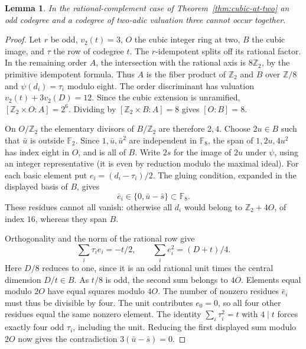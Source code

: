 \documentclass[11pt,a4paper]{article}
\newtheorem{lemma}[theorem]{Lemma}
\numberwithin{equation}{section}
\begin{document}
\begin{lemma}\label{lem:cubic-eight-depth}
In the rational-complement case of Theorem~\ref{thm:cubic-at-two}
an odd codegree and a codegree of two-adic valuation three cannot occur together.
\end{lemma}
\begin{proof}
Let $r$ be odd, $v_2(t)=3$, $O$ the cubic integer ring at two, $B$ the cubic image, and $\tau$ the row of codegree $t$. The $r$-idempotent splits off its rational factor. In the
remaining order $A$, the intersection with the rational axis is
$8\mathbb Z_2$, by the primitive idempotent formula. Thus $A$ is
the fiber product of $\mathbb Z_2$ and $B$ over $\mathbb Z/8$ and
$\psi(d_i)=\tau_i$ modulo eight. The order discriminant has
valuation $v_2(t)+3v_2(D)=12$. Since the cubic extension is unramified,
$[\mathbb Z_2\times O:A]=2^6$. Dividing by
$[\mathbb Z_2\times B:A]=8$ gives $[O:B]=8$.

On $O/\mathbb Z_2$ the elementary divisors of $B/\mathbb Z_2$ are
therefore $2,4$. Choose $2u\in B$ such that $\bar u$ is outside
$\mathbb F_2$. Since $1,\bar u,\bar u^2$ are independent in
$\mathbb F_8$, the span of $1,2u,4u^2$ has index eight in $O$,
and is all of $B$. Write $2s$ for the image of $2u$ under
$\psi$, using an integer representative
(it is even by reduction modulo the maximal ideal). For each basic
element put $e_i=(d_i-\tau_i)/2$. The gluing condition, expanded in
the displayed basis of $B$, gives
\[
 \bar e_i\in\{0,\bar u-\bar s\}\subset\mathbb F_8 .
\]
These residues cannot all vanish: otherwise all $d_i$ would belong to
$\mathbb Z_2+4O$, of index $16$, whereas they span $B$.

Orthogonality and the norm of the rational row give
\[
 \sum_i\tau_i e_i=-t/2,\qquad
 \sum_i e_i^2=(D+t)/4.
\]
Here $D/8$ reduces to one, since it is an odd rational unit times
the central dimension $D/t\in B$. As $t/8$ is odd, the second sum
belongs to $4O$. Elements equal modulo $2O$ have equal squares modulo
$4O$. The number of nonzero residues $\bar e_i$ must thus be divisible
by four. The unit contributes $e_0=0$, so all four other residues
equal the same nonzero element. The identity $\sum_i\tau_i^2=t$ with
$4\mid t$ forces exactly four odd $\tau_i$, including the unit.
Reducing the first displayed sum modulo $2O$ now gives the contradiction
$3(\bar u-\bar s)=0$.
\end{proof}
\end{document}

